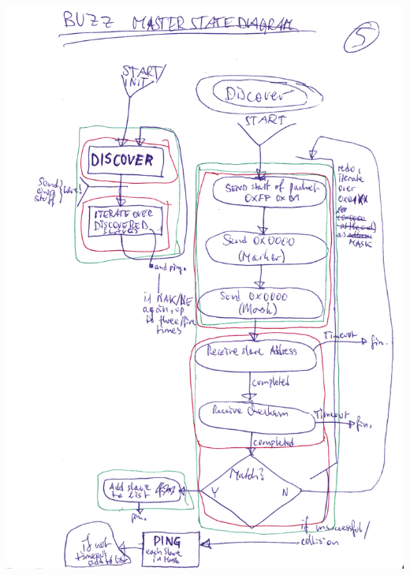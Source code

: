 \documentclass[12pt,a4paper,notitlepage]{article}
\begin{document}
\begin{center}
\includegraphics[width=\textwidth]{images/image4_enhanced_small.png}
\newpage

\end{center}
\end{document}
